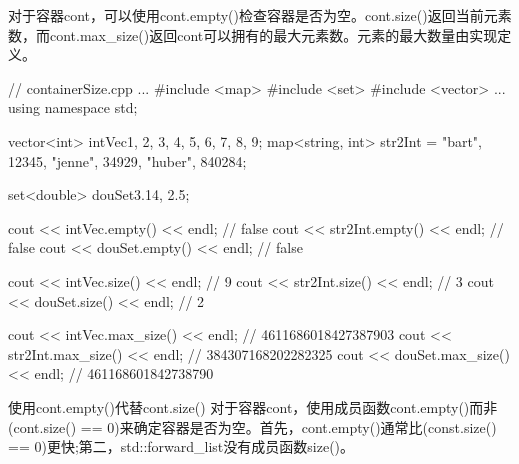 对于容器cont，可以使用cont.empty()检查容器是否为空。cont.size()返回当前元素数，而cont.max\_size()返回cont可以拥有的最大元素数。元素的最大数量由实现定义。


\begin{cpp}
// containerSize.cpp
...
#include <map>
#include <set>
#include <vector>
...
using namespace std;

vector<int> intVec{1, 2, 3, 4, 5, 6, 7, 8, 9};
map<string, int> str2Int = {{"bart", 12345},
	{"jenne", 34929}, {"huber", 840284}};
	
set<double> douSet{3.14, 2.5};

cout << intVec.empty() << endl; // false
cout << str2Int.empty() << endl; // false
cout << douSet.empty() << endl; // false

cout << intVec.size() << endl; // 9
cout << str2Int.size() << endl; // 3
cout << douSet.size() << endl; // 2

cout << intVec.max_size() << endl; // 4611686018427387903
cout << str2Int.max_size() << endl; // 384307168202282325
cout << douSet.max_size() << endl; // 461168601842738790
\end{cpp}


\begin{myTip}{使用cont.empty()代替cont.size()}
对于容器cont，使用成员函数cont.empty()而非(cont.size() == 0)来确定容器是否为空。首先，cont.empty()通常比(const.size() == 0)更快;第二，std::forward\_list没有成员函数size()。	
\end{myTip}












